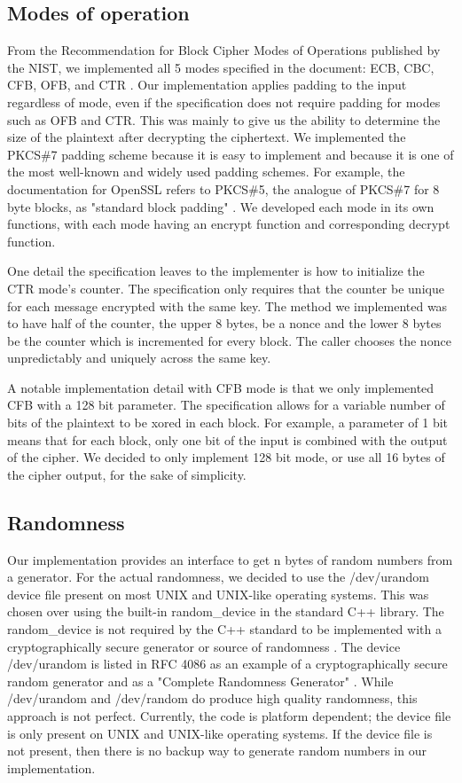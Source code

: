 \documentclass[a4paper,12pt]{article}
\begin{document}
\subsection{Modes of operation}
From the Recommendation for Block Cipher Modes of Operations published by the NIST, we implemented all 5 modes specified in the document: ECB, CBC, CFB, OFB, and CTR \cite{Modes}. Our implementation applies padding to the input regardless of mode, even if the specification does not require padding for modes such as OFB and CTR. This was mainly to give us the ability to determine the size of the plaintext after decrypting the ciphertext. We implemented the PKCS\#7 padding scheme because it is easy to implement and because it is one of the most well-known and widely used padding schemes. For example, the documentation for OpenSSL refers to PKCS\#5, the analogue of PKCS\#7 for 8 byte blocks, as "standard block padding" \cite{openssl}. We developed each mode in its own functions, with each mode having an encrypt function and corresponding decrypt function.

One detail the specification leaves to the implementer is how to initialize the CTR mode's counter. The specification only requires that the counter be unique for each message encrypted with the same key. The method we implemented was to have half of the counter, the upper 8 bytes, be a nonce and the lower 8 bytes be the counter which is incremented for every block. The caller chooses the nonce unpredictably and uniquely across the same key.

A notable implementation detail with CFB mode is that we only implemented CFB with a 128 bit parameter. The specification allows for a variable number of bits of the plaintext to be xored in each block. For example, a parameter of 1 bit means that for each block, only one bit of the input is combined with the output of the cipher. We decided to only implement 128 bit mode, or use all 16 bytes of the cipher output, for the sake of simplicity.

\subsection{Randomness}
Our implementation provides an interface to get n bytes of random numbers from a generator. For the actual randomness, we decided to use the /dev/urandom device file present on most UNIX and UNIX-like operating systems. This was chosen over using the built-in {\selectfont random\_device} in the standard C++ library. The {\selectfont random\_device} is not required by the C++ standard to be implemented with a cryptographically secure generator or source of randomness \cite{iso14882}. The device /dev/urandom is listed in RFC 4086 as an example of a cryptographically secure random generator and as a "Complete Randomness Generator" \cite{rfc4086}. While /dev/urandom and /dev/random do produce high quality randomness, this approach is not perfect. Currently, the code is platform dependent; the device file is only present on UNIX and UNIX-like operating systems. If the device file is not present, then there is no backup way to generate random numbers in our implementation. 
\end{document}
